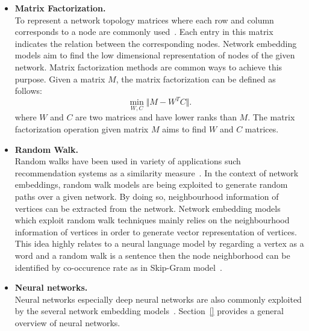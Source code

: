 \begin{itemize}
\item \textbf{Matrix Factorization.}\\
To represent a network topology matrices where each row and column corresponds to a node are commonly used~\cite{DBLP:journals/tkde/CuiWPZ19}. Each entry in this matrix indicates the relation between the corresponding nodes. Network embedding models aim to find the low dimensional representation of nodes of the given network. Matrix factorization methods are common ways to achieve this purpose. Given a matrix $M$, the matrix factorization can be defined as follows:\\ \begin{equation}\label{eq:matrix_factorization}
\min_{W, C} \Vert M - W^T C\Vert .
\end{equation}
where $W$ and $C$ are two matrices and have lower ranks than $M$. The matrix factorization operation given matrix $M$ aims to find $W$ and $C$ matrices.\\
\item \textbf{Random Walk.}\\
Random walks have been used in variety of applications such recommendation systems as a similarity measure~\cite{DeepWalk}. In the context of network embeddings, random walk models are being exploited to generate random paths over a given network. By doing so, neighbourhood information of vertices can be extracted from the network. Network embedding models which exploit random walk techniques mainly relies on the neighbourhood information of vertices in order to generate vector representation of vertices. This idea highly relates to a neural language model by regarding a vertex as a word and a random walk is a sentence then the node neighborhood can be identified by co-occurence rate as in Skip-Gram model~\cite{DBLP:journals/tkde/CuiWPZ19}.   \\
\item \textbf{Neural networks.}\\
Neural networks especially deep neural networks are also commonly exploited by the several network embedding models~\cite{}. Section~\ref{} provides a general overview of neural networks. \\ 
\end{itemize}


